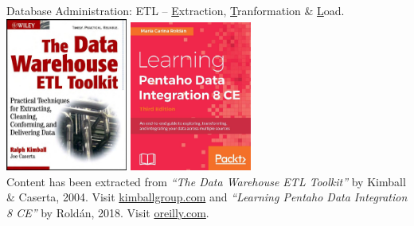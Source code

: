 \documentclass[aspectratio=169]{beamer}
\begin{document}
\begin{frame}{Database Administration: ETL -- \underline{E}xtraction, \underline{T}ranformation \& \underline{L}oad.}
    \centering
    \includegraphics[width=0.3\textwidth]{figures/book_cover5}
    \hspace{5mm}
    \includegraphics[width=0.3\textwidth]{figures/book_cover6} \\
    \vspace{1mm}
    {
        \scriptsize
        Content has been extracted from \textit{``The Data Warehouse ETL Toolkit''} by Kimball \& Caserta, 2004. Visit \href{https://www.kimballgroup.com/data-warehouse-business-intelligence-resources/books/data-warehouse-dw-etl-toolkit/}{kimballgroup.com}
        and
        \textit{``Learning Pentaho Data Integration 8 CE''} by Roldán, 2018. Visit \href{https://www.oreilly.com/library/view/learning-pentaho-data/9781788292436/a364bedc-72f6-4ccb-94a7-74c499bda3c4.xhtml}{oreilly.com}.
    }
\end{frame}
\end{document}
